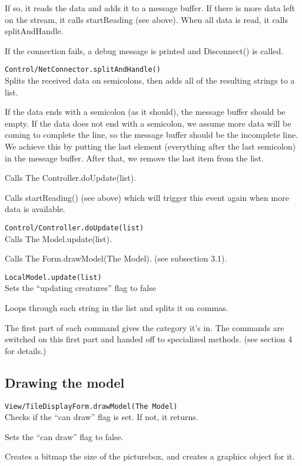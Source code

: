 \documentclass{article}
\begin{document}
			If so, it reads the data and adds it to a message buffer. If there is more data left on the stream, it calls startReading (see above). When all data is read, it
			calls splitAndHandle.
			
			If the connection fails, a debug message is printed and Disconnect() is called.
			
		\texttt{Control/NetConnector.splitAndHandle()}\\
			Splits the received data on semicolons, then adds all of the resulting strings to a list.
			
			If the data ends with a semicolon (as it should), the message buffer should be empty. If the data does not end with a semicolon, we assume more data will be coming
			to complete the line, so the message buffer should be the incomplete line. We achieve this by putting the last element (everything after the last semicolon) in the
			message buffer. After that, we remove the last item from the list.
			
			Calls The Controller.doUpdate(list).
			
			Calls startReading() (see above) which will trigger this event again when more data is available.
			
		\texttt{Control/Controller.doUpdate(list)}\\
			Calls The Model.update(list).
			
			Calls The Form.drawModel(The Model). (see subsection 3.1).
			
		\texttt{LocalModel.update(list)}\\
			Sets the ``updating creatures'' flag to false
			
			Loops through each string in the list and splits it on commas.
			
			The first part of each command gives the category it's in. The commands are switched on this first part and handed off to specialized methods. (see section 4 for details.)

		\subsection{Drawing the model}
			\texttt{View/TileDisplayForm.drawModel(The Model)}\\
				Checks if the ``can draw'' flag is set. If not, it returns.
				
				Sets the ``can draw'' flag to false.
				
				Creates a bitmap the size of the picturebox, and creates a graphics object for it.
				
\end{document}

